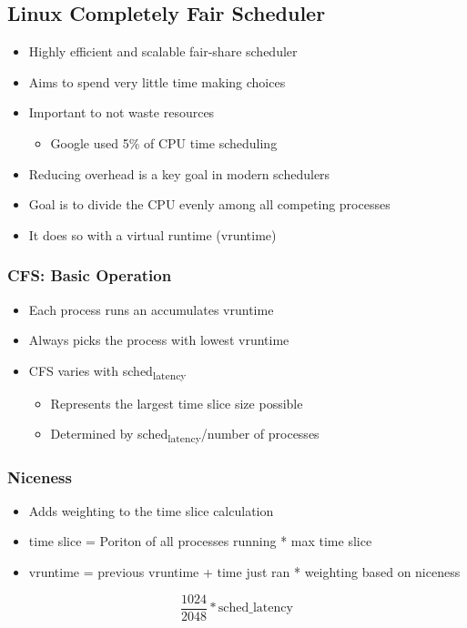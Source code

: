 \documentclass[11pt]{article}
\begin{document}
\subsection{Linux Completely Fair Scheduler}
\label{sec:org0958630}
\begin{itemize}
\item Highly efficient and scalable fair-share scheduler
\item Aims to spend very little time making choices
\item Important to not waste resources
\begin{itemize}
\item Google used 5\% of CPU time scheduling
\end{itemize}
\item Reducing overhead is a key goal in modern schedulers
\item Goal is to divide the CPU evenly among all competing processes
\item It does so with a virtual runtime (vruntime)
\end{itemize}
\subsubsection{CFS: Basic Operation}
\label{sec:org4ea3699}
\begin{itemize}
\item Each process runs an accumulates vruntime
\item Always picks the process with lowest vruntime
\item CFS varies with sched\textsubscript{latency}
\begin{itemize}
\item Represents the largest time slice size possible
\item Determined by sched\textsubscript{latency}/number of processes
\end{itemize}
\end{itemize}
\subsubsection{Niceness}
\label{sec:org01ec592}
\begin{itemize}
\item Adds weighting to the time slice calculation
\item time slice = Poriton of all processes running * max time slice
\item vruntime = previous vruntime + time just ran * weighting based on niceness
\end{itemize}

\[
\frac{1024}{2048} * \text{sched_latency}
\]
\end{document}
